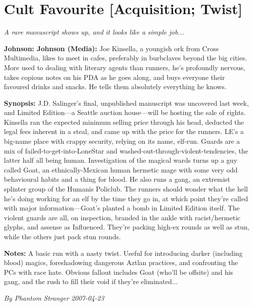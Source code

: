 \documentclass[letterpaper,twocolumn,10.5pt]{article}
\newenvironment{scenario}[6]
	{
		\section{#1 {\small[#2]}}
		\textit{#3}
		\def\TMPSCENARIO{#4 #5}
	}
	{\small\textit{By \TMPSCENARIO}}
\newcommand{\johnson}[2]{\textbf{Johnson: #1 (#2):}}
\newcommand{\synopsis}{\textbf{Synopsis: }}
\newcommand{\notes}{\textbf{Notes: }}
\begin{document}
\begin{scenario}{Cult Favourite}
	{Acquisition; Twist}
	{ A rare manuscript shows up, and it looks like a simple job...}
	{Phantom Stranger}
	{2007-04-23}
	{https://forum.rpg.net/showthread.php?321504-Shadowrun-4th-101-Instant-Scenarios\&p=7208372#post7208372}

\johnson{Johnson}{Media}  Joe Kinsella, a youngish ork from Cross Multimedia, likes to meet in cafes, preferably in burbclaves beyond the big cities. More used to dealing with literary agents than runners, he's profoundly nervous, takes copious notes on his PDA as he goes along, and buys everyone their favoured drinks and snacks. He tells them absolutely everything he knows.

\synopsis J.D. Salinger's final, unpublished manuscript was uncovered last week, and Limited Edition---a Seattle auction house---will be hosting the sale of rights. Kinsella ran the expected minimum selling price through his head, deducted the legal fees inherent in a steal, and came up with the price for the runners. LE's a big-name place with crappy security, relying on its name, elf-run. Guards are a mix of failed-to-get-into-LoneStar and washed-out-through-violent-tendencies, the latter half all being human. Investigation of the magical wards turns up a guy called Goat, an ethnically-Mexican human hermetic mage with some very odd behavioural habits and a thing for blood. He also runs a gang, an extremist splinter group of the Humanis Policlub. The runners should wonder what the hell he's doing working for an elf by the time they go in, at which point they're called with major information---Goat's planted a bomb in Limited Edition itself. The violent guards are all, on inspection, branded in the ankle with racist/hermetic glyphs, and assense as Influenced. They're packing high-ex rounds as well as stun, while the others just pack stun rounds.

\notes A basic run with a nasty twist. Useful for introducing darker (including blood) magics, foreshadowing dangerous Aztlan practices, and confronting the PCs with race hate. Obvious fallout includes Goat (who'll be offsite) and his gang, and the rush to fill their void if they're eliminated...

\end{scenario}
\end{document}
